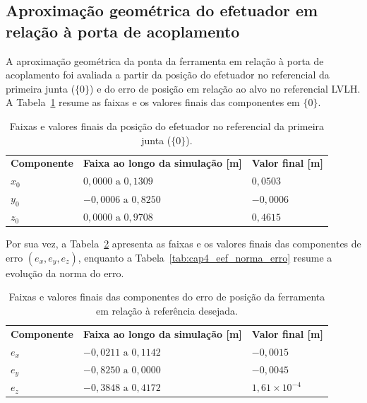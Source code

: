 \subsection{Aproximação geométrica do efetuador em relação à porta de acoplamento}
\label{sec:cap4_app_final_eef}

A aproximação geométrica da ponta da ferramenta em relação à porta de acoplamento foi avaliada a partir da posição do efetuador no referencial da primeira junta ($\{0\}$) e do erro de posição em relação ao alvo no referencial LVLH. A Tabela~\ref{tab:cap4_eef_referencial0_pos} resume as faixas e os valores finais das componentes em $\{0\}$.

\begin{table}[H]
\centering
\caption{Faixas e valores finais da posição do efetuador no referencial da primeira junta ($\{0\}$).}
\label{tab:cap4_eef_referencial0_pos}
\begin{tabularx}{\linewidth}{|
  >{\centering\arraybackslash}X|
  >{\centering\arraybackslash}X|
  >{\centering\arraybackslash}X|}
\hline
\textbf{Componente} &
\textbf{Faixa ao longo da simulação [m]} &
\textbf{Valor final [m]} \\
\hhline{|=|=|=|}
$x_0$ & $0{,}0000 \text{ a } 0{,}1309$ & $0{,}0503$ \\
\hline
$y_0$ & $-0{,}0006 \text{ a } 0{,}8250$ & $-0{,}0006$ \\
\hline
$z_0$ & $0{,}0000 \text{ a } 0{,}9708$ & $0{,}4615$ \\
\hline
\end{tabularx}
\end{table}


Por sua vez, a Tabela~\ref{tab:cap4_eef_erro_referencial} apresenta as faixas e os valores finais das componentes de erro $(e_x,e_y,e_z)$, enquanto a Tabela~\ref{tab:cap4_eef_norma_erro} resume a evolução da norma do erro.

\begin{table}[H]
\centering
\caption{Faixas e valores finais das componentes do erro de posição da ferramenta em relação à referência desejada.}
\label{tab:cap4_eef_erro_referencial}
\begin{tabularx}{\linewidth}{|
  >{\centering\arraybackslash}X|
  >{\centering\arraybackslash}X|
  >{\centering\arraybackslash}X|}
\hline
\textbf{Componente} &
\textbf{Faixa ao longo da simulação [m]} &
\textbf{Valor final [m]} \\
\hhline{|=|=|=|}
$e_x$ & $-0{,}0211 \text{ a } 0{,}1142$ & $-0{,}0015$ \\
\hline
$e_y$ & $-0{,}8250 \text{ a } 0{,}0000$ & $-0{,}0045$ \\
\hline
$e_z$ & $-0{,}3848 \text{ a } 0{,}4172$ & $1{,}61\times 10^{-4}$ \\
\hline
\end{tabularx}
\end{table}

